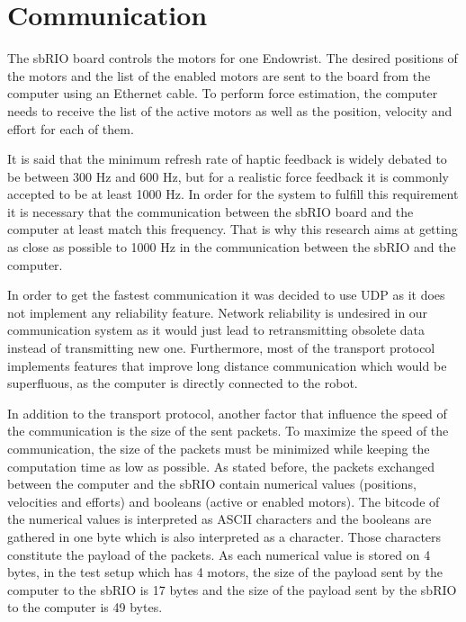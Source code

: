 \section{Communication}


The sbRIO board controls the motors for one Endowrist. The desired positions of the motors and the list of the enabled motors are sent to the board from the computer using an Ethernet cable. To perform force estimation, the computer needs to receive the list of the active motors as well as the position, velocity and effort for each of them.


It is said that the minimum refresh rate of haptic feedback is widely debated to
be between 300 Hz and 600 Hz, but for a realistic force feedback it is commonly accepted
to be at least 1000 Hz\cite{coles2011role}. In order for the system to fulfill this requirement it is necessary that the communication between the sbRIO board and the computer at least match this frequency. That is why this research aims at getting as close as possible to 1000 Hz in the communication between the sbRIO and the computer.


In order to get the fastest communication it was decided to use UDP as it does not implement any reliability feature. Network reliability is undesired in our communication system as it would just lead to retransmitting obsolete data instead of transmitting new one. Furthermore, most of the transport protocol implements features that improve long distance communication which would be superfluous, as the computer is directly connected to the robot.
 
In addition to the transport protocol, another factor that influence the speed of the communication is the size of the sent packets. To maximize the speed of the communication, the size of the packets must be minimized while keeping the computation time as low as possible. As stated before, the packets exchanged between the computer and the sbRIO contain numerical values (positions, velocities and efforts) and booleans (active or enabled motors). The bitcode of the numerical values is interpreted as ASCII characters and the booleans are gathered in one byte which is also interpreted as a character. Those characters constitute the payload of the packets. As each numerical value is stored on 4 bytes, in the test setup which has 4 motors, the size of the payload sent by the computer to the sbRIO is 17 bytes and the size of the payload sent by the sbRIO to the computer is 49 bytes.

